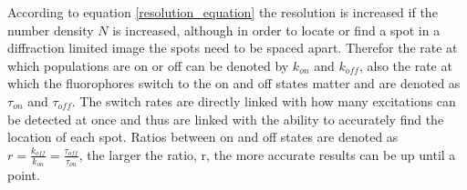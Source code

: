    According to equation \ref{resolution_equation} the resolution is increased 
   if the number density $N$ is increased, although in order to locate or find a spot 
   in a diffraction limited image the spots need to be spaced apart. 
   Therefor the rate at which populations are on or off can be denoted by $k_{on}$ and 
   $k_{off}$, also the rate at which the fluorophores switch to the on and off states matter 
   and are denoted as $\tau_{on}$ and $\tau_{off}$. The switch rates are directly linked with 
   how many excitations can be detected at once and thus are linked with the ability to 
   accurately find the location of each spot. Ratios between on and off states are denoted as 
   $r=\frac{k_{off}}{k_{on}}=\frac{\tau_{off}}{\tau_{on}}$, the larger the ratio, r, the more 
   accurate results can be up until a point.
